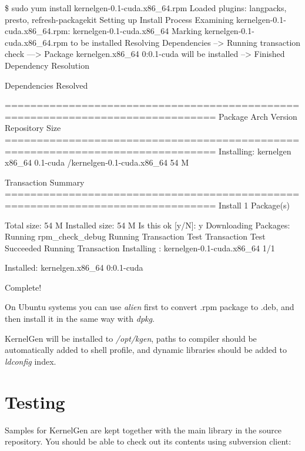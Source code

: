 \documentclass[a4,12pt]{article}
\begin{document}
\begin{code}
\$ sudo yum install kernelgen-0.1-cuda.x86_64.rpm
Loaded plugins: langpacks, presto, refresh-packagekit
Setting up Install Process
Examining kernelgen-0.1-cuda.x86_64.rpm: kernelgen-0.1-cuda.x86_64
Marking kernelgen-0.1-cuda.x86_64.rpm to be installed
Resolving Dependencies
--> Running transaction check
---> Package kernelgen.x86_64 0:0.1-cuda will be installed
--> Finished Dependency Resolution

Dependencies Resolved

===============================================================================
 Package              Arch      Version     Repository                   Size
===============================================================================
Installing:
 kernelgen            x86_64    0.1-cuda    /kernelgen-0.1-cuda.x86_64   54 M

Transaction Summary
===============================================================================
Install       1 Package(s)

Total size: 54 M
Installed size: 54 M
Is this ok [y/N]: y
Downloading Packages:
Running rpm_check_debug
Running Transaction Test
Transaction Test Succeeded
Running Transaction
  Installing : kernelgen-0.1-cuda.x86_64                                                                                                         1/1 

Installed:
  kernelgen.x86_64 0:0.1-cuda                                                                                                                        

Complete!
\end{code}

On Ubuntu systems you can use \emph{alien} first to convert .rpm package to .deb, and then install it in the same way with \emph{dpkg}.

KernelGen will be installed to \emph{/opt/kgen}, paths to compiler should be automatically added to shell profile, and dynamic libraries should be added to \emph{ldconfig} index.

\section{Testing}

Samples for KernelGen are kept together with the main library in the source repository. You should be able to check out its contents using subversion client:
\end{document}
